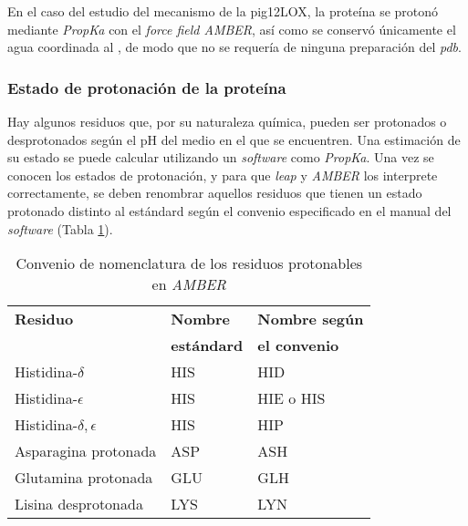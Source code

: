			\textsf{En el caso del estudio del mecanismo de la pig12LOX, la proteína se protonó mediante \textit{PropKa} con el \textit{force field AMBER}, así como se conservó únicamente el agua coordinada al , de modo que no se requería de ninguna preparación del \textit{pdb}.}
			
		\subsubsection{Estado de protonación de la proteína}
			Hay algunos residuos que, por su naturaleza química, pueden ser protonados o desprotonados según el pH del medio en el que se encuentren. Una estimación de su estado se puede calcular utilizando un \textit{software} como \textit{PropKa}. Una vez se conocen los estados de protonación, y para que \textit{leap} y \textit{AMBER} los interprete correctamente, se deben renombrar aquellos residuos que tienen un estado protonado distinto al estándard según el convenio especificado en el manual del \textit{software} (Tabla \ref{tab:convenio_nomenclatura_amber}).
            \begin{table}[h]
                \centering
                \caption{Convenio de nomenclatura de los residuos protonables en \textit{AMBER}}
                \label{tab:convenio_nomenclatura_amber}
                \begin{tabular}{l|l|l}
                    \textbf{Residuo}              		& \textbf{Nombre}       & \textbf{Nombre según}		\\ 
                    \                                	&\textbf{estándard}     & \textbf{el convenio}      \\
                    \hline
                    Histidina-${\delta}$            	& HIS                   & HID                       \\
                    Histidina-${\epsilon}$         		& HIS                   & HIE o HIS                 \\
                    Histidina-${\delta},{\epsilon}$ 	& HIS                   & HIP                       \\
                    Asparagina protonada              	& ASP                   & ASH                       \\
                    Glutamina protonada                 & GLU                   & GLH                       \\
                    Lisina desprotonada                 & LYS                   & LYN                                
                \end{tabular}
            \end{table}
			

